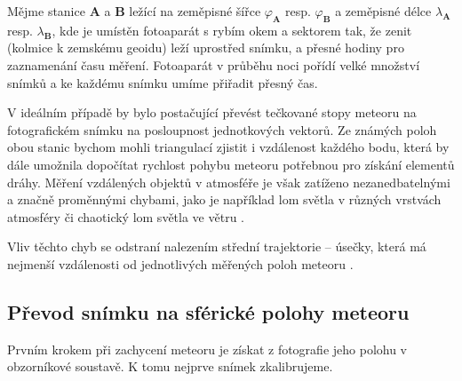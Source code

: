 \medskip

Mějme stanice \textbf{A} a \textbf{B} ležící na zeměpisné šířce $\varphi_\mathbf{A}$ resp. $\varphi_\mathbf{B}$ a zeměpisné délce $\lambda_\mathbf{A}$ resp. $\lambda_\mathbf{B}$, kde je umístěn fotoaparát s rybím okem a sektorem tak, že zenit (kolmice k zemskému geoidu) leží uprostřed snímku, a přesné hodiny pro zaznamenání času měření. Fotoaparát v průběhu noci pořídí velké množství snímků a ke každému snímku umíme přiřadit přesný čas.


\smallskip

V ideálním případě by bylo postačující převést tečkované stopy meteoru na fotografickém snímku na posloupnost jednotkových vektorů. Ze známých poloh obou stanic bychom mohli triangulací zjistit i vzdálenost každého bodu, která by dále umožnila dopočítat rychlost pohybu meteoru potřebnou pro získání elementů dráhy. Měření vzdálených objektů v atmosféře je však zatíženo nezanedbatelnými a značně proměnnými chybami, jako je například lom světla v různých vrstvách atmosféry či chaotický lom světla ve větru \cite{radiosurvey}.

Vliv těchto chyb se odstraní nalezením střední trajektorie -- úsečky, která má nejmenší vzdálenosti od jednotlivých měřených poloh meteoru \cite{ceplecha}.

\subsection{Převod snímku na sférické polohy meteoru}%
Prvním krokem při zachycení meteoru je získat z fotografie jeho polohu v obzorníkové soustavě. K tomu nejprve snímek zkalibrujeme.

